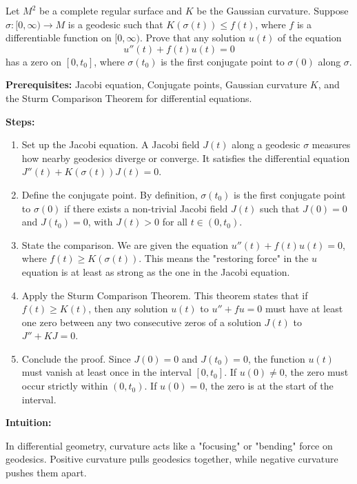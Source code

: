 \begin{exercise}
\label{geometry:2013:3}
Let $M^{2}$ be a complete regular surface and $K$ be the Gaussian curvature. Suppose $\sigma : [0, \infty) \to M$ is a geodesic such that $K(\sigma(t)) \leq f(t)$, where $f$ is a differentiable function on $[0, \infty)$. Prove that any solution $u(t)$ of the equation
\[ u''(t) + f(t)u(t) = 0 \]
has a zero on $[0, t_{0}]$, where $\sigma(t_{0})$ is the first conjugate point to $\sigma(0)$ along $\sigma$.
\end{exercise}

\begin{solution}
\textbf{Prerequisites:} Jacobi equation, Conjugate points, Gaussian curvature $K$, and the Sturm Comparison Theorem for differential equations.

\textbf{Steps:}
\begin{enumerate}
    \item Set up the Jacobi equation. A Jacobi field $J(t)$ along a geodesic $\sigma$ measures how nearby geodesics diverge or converge. It satisfies the differential equation $J''(t) + K(\sigma(t))J(t) = 0$.

    \item Define the conjugate point. By definition, $\sigma(t_0)$ is the first conjugate point to $\sigma(0)$ if there exists a non-trivial Jacobi field $J(t)$ such that $J(0) = 0$ and $J(t_0) = 0$, with $J(t) > 0$ for all $t \in (0, t_0)$.

    \item State the comparison. We are given the equation $u''(t) + f(t)u(t) = 0$, where $f(t) \geq K(\sigma(t))$. This means the "restoring force" in the $u$ equation is at least as strong as the one in the Jacobi equation.

    \item Apply the Sturm Comparison Theorem. This theorem states that if $f(t) \geq K(t)$, then any solution $u(t)$ to $u'' + fu = 0$ must have at least one zero between any two consecutive zeros of a solution $J(t)$ to $J'' + KJ = 0$.

    \item Conclude the proof. Since $J(0) = 0$ and $J(t_0) = 0$, the function $u(t)$ must vanish at least once in the interval $[0, t_0]$. If $u(0) \neq 0$, the zero must occur strictly within $(0, t_0)$. If $u(0) = 0$, the zero is at the start of the interval.
\end{enumerate}

\textbf{Intuition:}

In differential geometry, curvature acts like a "focusing" or "bending" force on geodesics. Positive curvature pulls geodesics together, while negative curvature pushes them apart. 


\end{solution}
